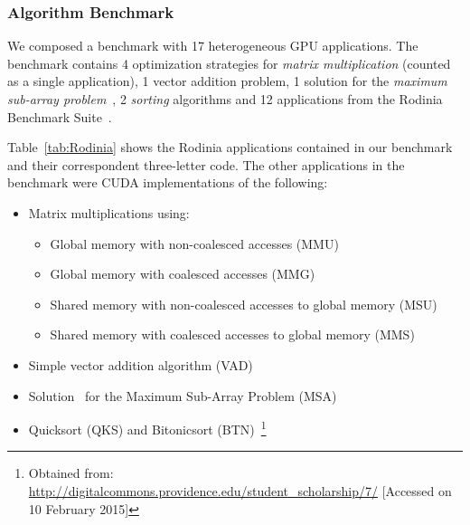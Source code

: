 \subsubsection{Algorithm Benchmark}

We composed a benchmark with 17 heterogeneous GPU applications.  The benchmark
contains 4 optimization strategies for \emph{matrix multiplication} (counted as
a single application), 1 vector addition problem, 1 solution for the
\emph{maximum sub-array problem}~\cite{ferreira2014parallel}, 2 \emph{sorting}
algorithms and 12 applications from the Rodinia Benchmark
Suite~\cite{che2009rodinia}.

Table~\ref{tab:Rodinia} shows the Rodinia applications contained in our
benchmark and their correspondent three-letter code.  The other applications in
the benchmark were CUDA implementations of the following:

\begin{itemize}
    \item Matrix multiplications using:
        \begin{itemize}
             \item Global memory with non-coalesced accesses (MMU)
             \item Global memory with coalesced accesses (MMG)
             \item Shared memory with non-coalesced accesses to global memory
                 (MSU)
             \item Shared memory with coalesced accesses to global memory (MMS)
        \end{itemize}
    \item Simple vector addition algorithm (VAD)
    \item Solution~\cite{alves2004bsp,ferreira2014parallel} for the Maximum
        Sub-Array Problem (MSA)
    \item Quicksort (QKS) and Bitonicsort (BTN)~\footnote{Obtained from:
        \url{http://digitalcommons.providence.edu/student\_scholarship/7/}
        [Accessed on 10 February 2015]}
\end{itemize}

